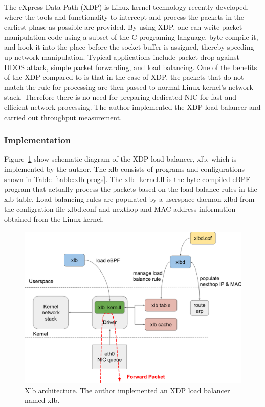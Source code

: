 The eXpress Data Path (XDP) \cite{hoiland2018express} is Linux kernel technology recently developed, where the tools and functionality to intercept and process the packets in the earliest phase as possible are provided.
By using XDP, one can write packet manipulation code using a subset of the C programing language, byte-compile it, and hook it into the place before the socket buffer is assigned, thereby speeding up network manipulation.
Typical applications include packet drop against DDOS attack, simple packet forwarding, and load balancing.
One of the benefits of the XDP compared to  is that in the case of XDP, the packets that do not match the rule for processing are then passed to normal Linux kernel's network stack.
Therefore there is no need for preparing dedicated NIC for fast and efficient network processing.
The author implemented the XDP load balancer and carried out throughput measurement.

\subsubsection{Implementation}

Figure~\ref{fig:xlb-schem} show schematic diagram of the XDP load balancer, xlb, which is implemented by the author.
The xlb consists of programs and configurations shown in Table~\ref{table:xlb-progs}.
The xlb\_kernel.ll is the byte-compiled eBPF program that actually process the packets based on the load balance rules in the xlb table.
Load balancing rules are populated by a userspace daemon xlbd from the configration file xlbd.conf and nexthop and MAC address information obtained from the Linux kernel.

\begin{figure}[h]
  \centering
  \includegraphics[width=0.9\columnwidth]{Figs/xlb-schem}

  \par\bigskip
  \centering
  \begin{minipage}{0.9\columnwidth}
    \caption[Xlb architecture]{
      Xlb architecture.
      The author implemented an XDP load balancer named xlb.
    }
    \label{fig:xlb-schem}
  \end{minipage}
\end{figure}

